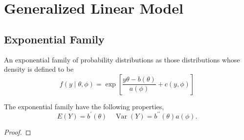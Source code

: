 \chapter{Generalized Linear Model}

\section{Exponential Family}

\begin{definition} \label{def:exponential-family}
    An exponential family of probability distributions as those distributions whose density is defined to be
    \begin{equation}
        f\left(y\mid\theta,\phi\right)=\exp\left[\frac{y\theta-b(\theta)}{a(\phi)}+c(y,\phi)\right]
    \end{equation}
\end{definition}

\begin{property}
    The exponential family have the following properties,
    \begin{equation*}
        E(Y)=b^{\prime}(\theta)\quad\operatorname{Var}(Y)=b^{\prime\prime}(\theta)a(\phi).
    \end{equation*}
\end{property}

\begin{proof}

\end{proof}

